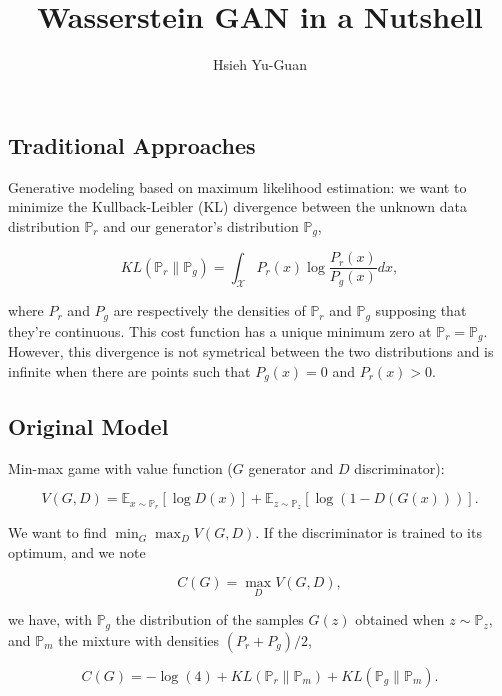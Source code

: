 
\title{Wasserstein GAN in a Nutshell\vspace{-0.5em}}
\author{Hsieh Yu-Guan}
\predate{} \postdate{}
\date{}
\maketitle


\subsection*{Traditional Approaches}

Generative modeling based on maximum likelihood estimation: we want to
minimize the Kullback-Leibler (KL) divergence between the unknown data
distribution $\mathbb{P}_r$ and our generator's distribution
$\mathbb{P}_g$,

\[ 
  KL(\mathbb{P}_r\|\mathbb{P}_g)
  = \int_{\mathcal{X}} P_r(x)\log\frac{P_r(x)}{P_g(x)} dx,
\]

where $P_r$ and $P_g$ are respectively the densities of $\mathbb{P}_r$
and $\mathbb{P}_g$ supposing that they're continuous. This cost function
has a unique minimum zero at $\mathbb{P}_r = \mathbb{P}_g$. However,
this divergence is not symetrical between the two distributions and is
infinite when there are points such that $P_g(x) = 0$ and $P_r(x) > 0$.

\subsection*{Original Model}

Min-max game with value function ($G$ generator and $D$ discriminator):

\[ 
  V(G, D)
  = \mathbb{E}_{x\sim \mathbb{P}_r}[\log D(x)]
  + \mathbb{E}_{z\sim \mathbb{P}_z}[\log(1-D(G(x)))].
\]

We want to find $\min_G \max_D V(G, D)$. If the discriminator is trained to
its optimum, and we note

\[ C(G) = \max_D V(G, D), \]

we have, with $\mathbb{P}_g$ the distribution of the samples $G(z)$
obtained when $z \sim \mathbb{P}_z$, and $\mathbb{P}_m$ the mixture with
densities $(P_r+P_g)/2$,

\[
  C(G) = -\log(4) + KL(\mathbb{P}_r \| \mathbb{P}_m) 
         + KL(\mathbb{P}_g \| \mathbb{P}_m).
\]

